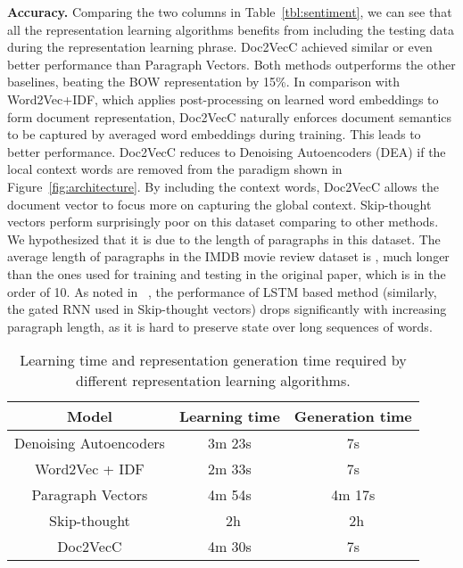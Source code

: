 \documentclass{article} \usepackage{iclr2017_conference,times}
\newcommand{\name}{Doc2VecC}
\begin{document}
\textbf{Accuracy.}
Comparing the two columns in Table~\ref{tbl:sentiment}, we can see that all the representation learning algorithms benefits from including the testing data during the representation learning phrase. \name{} achieved similar or even better performance than Paragraph Vectors. Both methods outperforms the other baselines,  beating the BOW representation by 15\%.  In comparison with Word2Vec+IDF, which applies post-processing on learned word embeddings to form document representation, \name{} naturally enforces document semantics to be captured by averaged word embeddings during training. This leads to better performance. \name{} reduces to Denoising Autoencoders (DEA) if the local context words are removed from the paradigm shown in Figure~\ref{fig:architecture}. By including the context words, \name{} allows the document vector to focus more on capturing the global context. Skip-thought vectors perform surprisingly poor on this dataset comparing to other methods. We hypothesized that it is due to the length of paragraphs in this dataset.  The average length of paragraphs in the IMDB movie review dataset is , much longer than the ones used for training and testing in the original paper, which is in the order of 10. As noted in ~\citep{tai2015improved}, the performance of LSTM based method (similarly, the gated RNN used in Skip-thought vectors) drops significantly with increasing paragraph length, as it is hard to preserve state over long sequences of words. 


\begin{table}
\caption{Learning time and representation generation time required by different representation learning algorithms. }
\label{tbl:time}
\centering
\begin{tabular}{|c||c|c|}
\hline
Model & Learning time &  Generation time\\
\hline
\hline
Denoising Autoencoders  & 3m 23s & 7s \\
Word2Vec + IDF  &  2m 33s & 7s\\
Paragraph Vectors  & 4m 54s & 4m 17s\\
Skip-thought & ~2h & ~2h \\
\name &  4m 30s & 7s \\
\hline
\end{tabular}
\label{tbl:sentimenttime}
\end{table}
\end{document}
